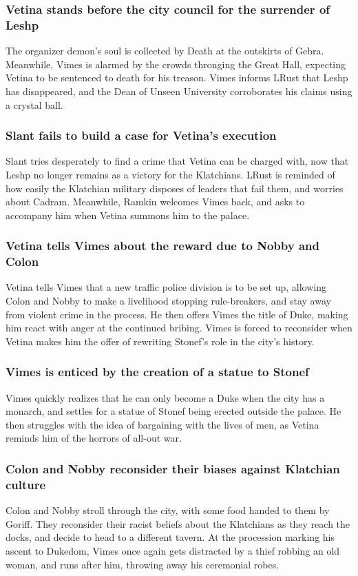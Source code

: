 \subsubsection{\Gls{Vetina} stands before the city council for the surrender of Leshp}
The organizer demon's soul is collected by \Gls{Death} at the outskirts of Gebra. Meanwhile,
\Gls{Vimes} is alarmed by the crowds thronging the Great Hall, expecting \Gls{Vetina} to be
sentenced to death for his treason. \Gls{Vimes} informs \Gls{LRust} that Leshp has disappeared,
and the \Gls{Dean} of Unseen University corroborates his claims using a crystal ball.

\subsubsection{\Gls{Slant} fails to build a case for \Gls{Vetina}'s execution}
\Gls{Slant} tries desperately to find a crime that \Gls{Vetina} can be charged with, now that
Leshp no longer remains as a victory for the Klatchians. \Gls{LRust} is reminded of how easily
the Klatchian military disposes of leaders that fail them, and worries about \Gls{Cadram}.
Meanwhile, \Gls{Ramkin} welcomes \Gls{Vimes} back, and asks to accompany him when \Gls{Vetina}
summons him to the palace.

\subsubsection{\Gls{Vetina} tells \Gls{Vimes} about the reward due to \Gls{Nobby} and \Gls{Colon}}
\Gls{Vetina} tells \Gls{Vimes} that a new traffic police division is to be set up, allowing
\Gls{Colon} and \Gls{Nobby} to make a livelihood stopping rule-breakers, and stay away from violent
crime in the process. He then offers \Gls{Vimes} the title of Duke, making him react with anger at
the continued bribing. \Gls{Vimes} is forced to reconsider when \Gls{Vetina} makes him the offer of
rewriting \Gls{Stonef}'s role in the city's history.

\subsubsection{\Gls{Vimes} is enticed by the creation of a statue to \Gls{Stonef}}
\Gls{Vimes} quickly realizes that he can only become a Duke when the city has a monarch, and
settles for a statue of \Gls{Stonef} being erected outside the palace. He then struggles with the
idea of bargaining with the lives of men, as \Gls{Vetina} reminds him of the horrors of all-out war.

\subsubsection{\Gls{Colon} and \Gls{Nobby} reconsider their biases against Klatchian culture}
\Gls{Colon} and \Gls{Nobby} stroll through the city, with some food handed to them by \Gls{Goriff}.
They reconsider their racist beliefs about the Klatchians as they reach the docks, and decide to
head to a different tavern. At the procession marking his ascent to Dukedom, \Gls{Vimes} once again
gets distracted by a thief robbing an old woman, and runs after him, throwing away his ceremonial
robes.